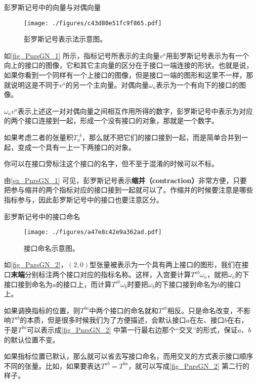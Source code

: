 \begin{example}{彭罗斯记号中的向量与对偶向量}\label{ex_PnrsGN_1}


\begin{figure}[ht]
\centering
\texttt{[image: ./figures/c43d80e51fc9f865.pdf]}
\caption{彭罗斯记号表示法示意图。} \label{fig_PnrsGN_1}
\end{figure}


如\autoref{fig_PnrsGN_1} 所示，指标记号所表示的主向量$v^a$用彭罗斯记号表示为有一个向上的接口的图像，它和其它主向量的区分在于接口一端连接的形状。也就是说，如果你看到一个同样有一个上接口的图像，但是接口一端的图形和这里不一样，那就说明这是不同于$v^a$的另一个主向量。对偶向量$\omega_a$表示为一个有向下的接口的图像。

$\omega_av^a$表示上述这一对对偶向量之间相互作用所得的数字，彭罗斯记号中表示为对应的两个接口连接到一起，形成一个没有接口的对象，那就是一个数字。

如果考虑二者的张量积$T_a^{\phantom{1}b}$，那么就不把它们的接口接到一起，而是简单合并到一起，变成一个具有一上一下两接口的对象。

你可以在接口旁标注这个接口的名字，但不至于混淆的时候可以不标。

\end{example}


由\autoref{ex_PnrsGN_1} 可见，彭罗斯记号表示\textbf{缩并（contraction）}非常方便，只要把参与缩并的两个指标对应的接口接到一起就可以了。作缩并的时候要注意是哪些指标参与，因此彭罗斯记号中的接口也要注意区分。



\begin{example}{彭罗斯记号中的接口命名}

\begin{figure}[ht]
\centering
\texttt{[image: ./figures/a47e8c42e9a362ad.pdf]}
\caption{接口命名示意图。} \label{fig_PnrsGN_2}
\end{figure}

如\autoref{fig_PnrsGN_2}，$(2, 0)$型张量被表示为一个具有两上接口的图形，我们在接口\textbf{末端}分别标注两个接口对应的指标名称。这样，入宫要计算$T^{ab}\omega_{a}$，就把$\omega_{a}$的下接口接到命名为$a$的接口上，而计算$T^{ab}\omega_{b}$时要把$\omega_b$的下接口接到命名为$b$的接口上。

如果调换指标的位置，则$T^{ba}$中两个接口的命名就和$T^{ab}$相反。只是命名改变，不影响$T^{ab}$的本质，但是很多时候我们为了方便描述，会默认接口$a$在左、接口$b$在右，于是$T^{ba}$可以表示成\autoref{fig_PnrsGN_2} 中第一行最右边那个“交叉”的形式，保证$a$、$b$的默认位置不变。

如果指标位置已默认，那么就可以省去写接口命名，而用交叉的方式表示接口顺序不同的张量。比如，如果要表达$T^{ab}=T^{ba}$，就可以写成\autoref{fig_PnrsGN_2} 第二行的样子。

\end{example}



